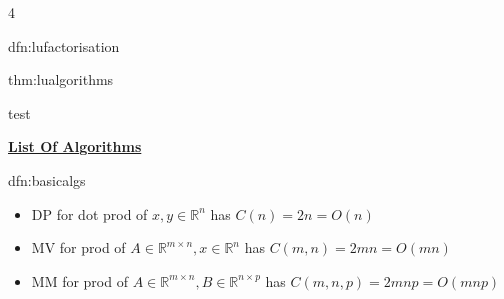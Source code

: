 \documentclass[landscape, 8pt]{extarticle}
\begin{document}
\begin{multicols*}{4}
\begin{dfn}[LU Factorisation]{dfn:lufactorisation}{ }
		\end{dfn}
		
		
		\begin{thm}[LU Algorithms]{thm:lualgorithms}{ }
			\begin{algorithm}[H]
				\caption{LU Factorisation}
				\begin{algorithmic}
				\State test
				\end{algorithmic}
			\end{algorithm}
			
		\end{thm}
		
		
		
		
		
		
		
		
		
		
		
		

{\footnotesize \textbf{\underline{List Of Algorithms}}}
	
		
		
		
		\begin{dfn}{dfn:basicalgs}{ }
			\begin{itemize}
				\item DP for dot prod of $x, y\in \mathbb{R}^n$ has $C(n) = 2n = O(n)$
				\item MV for prod of $A \in \mathbb{R}^{m \times n}, x\in \mathbb{R}^n$ has $C(m, n) = 2mn = O(mn)$
				\item MM for prod of $A\in \mathbb{R}^{m \times n}, B\in \mathbb{R}^{n \times p}$ has $C(m, n, p) = 2mnp = O(mnp)$
			\end{itemize}
			
		\end{dfn}
		
		
		
		
		
\end{multicols*}	
	
\end{document}
